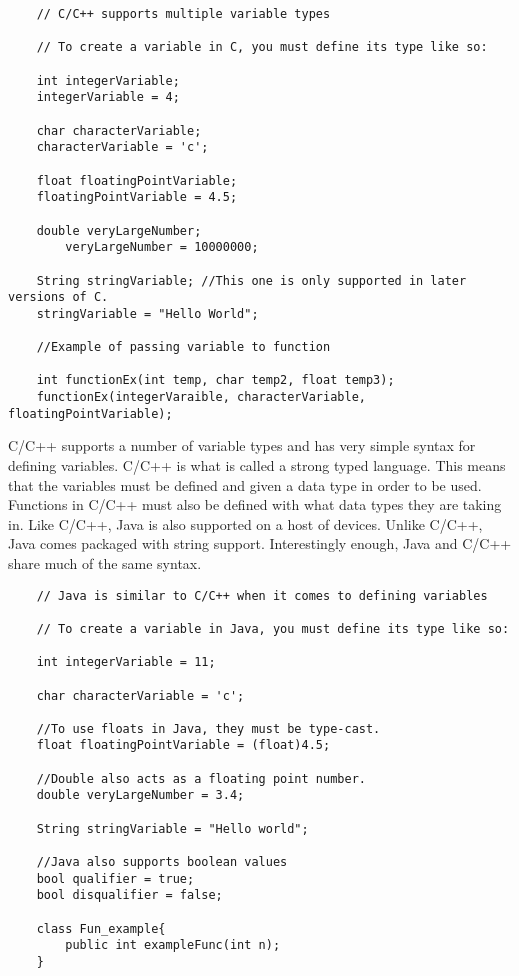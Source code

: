 \documentclass[journal,10pt,onecolumn,compsoc]{IEEEtran} \usepackage[margin=1.0in]{geometry} \usepackage{pdfpages} \usepackage{graphicx}
\begin{document}
\begin{lstlisting}
	// C/C++ supports multiple variable types

	// To create a variable in C, you must define its type like so:

	int integerVariable;
	integerVariable = 4;

	char characterVariable;
	characterVariable = 'c';
    
	float floatingPointVariable;
	floatingPointVariable = 4.5;

	double veryLargeNumber;
    	veryLargeNumber = 10000000;

	String stringVariable; //This one is only supported in later versions of C.
	stringVariable = "Hello World";

	//Example of passing variable to function
    
	int functionEx(int temp, char temp2, float temp3);
	functionEx(integerVaraible, characterVariable, floatingPointVariable);
\end{lstlisting}

\noindent C/C++ supports a number of variable types and has very simple syntax for defining variables. 
C/C++ is what is called a strong typed language.
This means that the variables must be defined and given a data type in order to be used. \cite{cppvar} 
Functions in C/C++ must also be defined with what data types they are taking in.
Like C/C++, Java is also supported on a host of devices. 
Unlike C/C++, Java comes packaged with string support.
Interestingly enough, Java and C/C++ share much of the same syntax.

\begin{lstlisting}
	// Java is similar to C/C++ when it comes to defining variables

	// To create a variable in Java, you must define its type like so:

	int integerVariable = 11;

	char characterVariable = 'c';

	//To use floats in Java, they must be type-cast. 
	float floatingPointVariable = (float)4.5; 
    
	//Double also acts as a floating point number.
	double veryLargeNumber = 3.4;

	String stringVariable = "Hello world";
    
	//Java also supports boolean values
	bool qualifier = true;
	bool disqualifier = false;
    
	class Fun_example{
    	public int exampleFunc(int n);
	}
\end{lstlisting}
\end{document}
